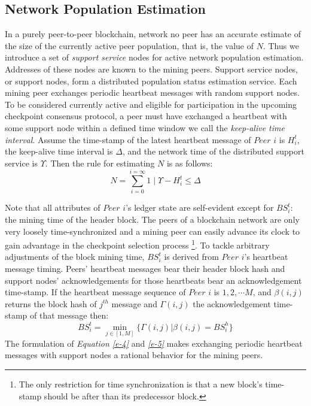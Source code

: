 \subsection{Network Population Estimation}
In a purely peer-to-peer blockchain, network no peer has an accurate estimate of the size of the currently active peer population, that is, the value of $N$. Thus we introduce a set of \textit{support service} nodes for active network population estimation. Addresses of these nodes are known to the mining peers. Support service nodes, or support nodes, form a distributed population status estimation service. Each mining peer exchanges periodic heartbeat messages with random support nodes. To be considered currently active and eligible for participation in the upcoming checkpoint consensus protocol, a peer must have exchanged a heartbeat with some support node within a defined time window we call the \textit{keep-alive time interval}. Assume the time-stamp of the latest heartbeat message of $Peer$ $i$ is $H_i^t$, the keep-alive time interval is $\Delta$, and the network time of the distributed support service is $\Upsilon$. Then the rule for estimating $N$ is as follows:  
\begin{equation}
\label{e-4}
N = \sum_{i = 0}^{i = \infty}{1 \mid \Upsilon - H_i^t \leq \Delta}
\end{equation}

Note that all attributes of $Peer$ $i$'s ledger state are self-evident except for $BS_i^t$: the mining time of the header block. The peers of a blockchain network are only very loosely time-synchronized \cite{Turek:1992:MFC:136541.136542} and a mining peer can easily advance its clock to gain advantage in the checkpoint selection process \footnote{The only restriction for time synchronization is that a new block's time-stamp should be after than its predecessor block.}. To tackle arbitrary adjustments of the block mining time, $BS_i^t$ is derived from $Peer$ $i$'s heartbeat message timing. Peers' heartbeat messages bear their header block hash and support nodes' acknowledgements for those heartbeats bear an acknowledgement time-stamp. If the heartbeat message sequence of $Peer$ $i$ is $1, 2, \cdots M$, and $\beta(i,j)$ returns the block hash of $j^{th}$ message and $\Gamma(i, j)$ the acknowledgement time-stamp of that message then:
\begin{equation}
\label{e-5}
BS_i^t = \min_{j \in \left[ 1, M \right]}\{\Gamma(i, j) | \beta(i,j) = BS_i^h \}
\end{equation}
The formulation of \textit{Equation \ref{e-4}} and \textit{\ref{e-5}} makes exchanging periodic heartbeat messages with support nodes a rational behavior for the mining peers.

